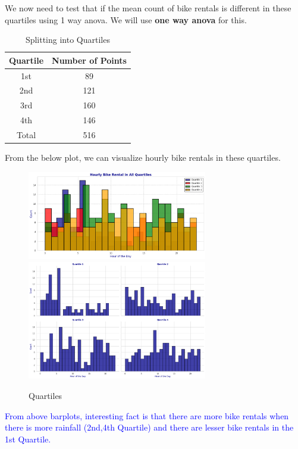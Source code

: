 \documentclass[12pt, letterpaper]{article}
\begin{document}
\newpage 
We now need to test that if the mean count of bike rentals is different in these quartiles using 1 way anova. We will use \textbf{one way anova} for this. \\

\begin{table}[h]
    \centering
    \begin{tabular}{|c|c|}
    \hline
    Quartile & Number of Points  \\ \hline
    1st  & 89  \\ \hline
    2nd  & 121 \\ \hline
    3rd  & 160 \\ \hline
    4th & 146 \\ \hline
    Total & 516 \\ \hline
    \end{tabular}
    \caption{Splitting into Quartiles}
\end{table}

From the below plot, we can visualize hourly bike rentals in these quartiles. \\
\begin{figure}[h]
    \centering
    \includegraphics[width=0.7\textwidth]{hourly1.png}
    \includegraphics[width=0.7\textwidth]{hourly2.png}
    \caption{Quartiles}
\end{figure}

\newpage

\textcolor{blue}{From above barplots, interesting fact is that there are more bike rentals when there is more rainfall (2nd,4th Quartile) and there are lesser bike rentals in the 1st Quartile.}
\end{document}
